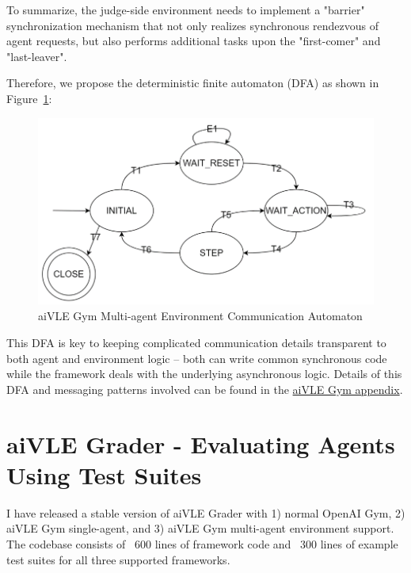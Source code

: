 To summarize, the judge-side environment needs to implement a "barrier" synchronization mechanism that not only realizes synchronous rendezvous of agent requests, but also performs additional tasks upon the "first-comer" and "last-leaver". 

Therefore, we propose the deterministic finite automaton (DFA) as shown in Figure~\ref{fig:aivle-gym-multi-dfa}:
\begin{figure}[H]
    \centering
    \includegraphics{images/aivle-gym-multi-dfa.png}
    \caption{aiVLE Gym Multi-agent Environment Communication Automaton}
    \label{fig:aivle-gym-multi-dfa}
\end{figure}

This DFA is key to keeping complicated communication details transparent to both agent and environment logic – both can write common synchronous code while the framework deals with the underlying asynchronous logic. Details of this DFA and messaging patterns involved can be found in the \href{https://google.com}{aiVLE Gym appendix}.

\section{aiVLE Grader - Evaluating Agents Using Test Suites}
\label{ch:aivle-grader}
I have released a stable version of aiVLE Grader with 1) normal OpenAI Gym, 2) aiVLE Gym single-agent, and 3) aiVLE Gym multi-agent environment support. The codebase consists of ~600 lines of framework code and ~300 lines of example test suites for all three supported frameworks.

